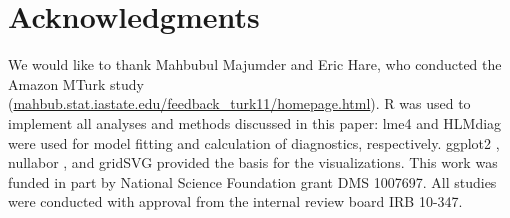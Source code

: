 \documentclass[12pt]{article} %
\newcommand{\hh}[1]{{\color{orange} #1}}
\newcommand{\alnote}[1]{\todo[inline,color=green!40]{#1}} %
\newcommand{\hhnote}[1]{\todo[inline,color=orange!40]{#1}}
\begin{document}




  






\section{Acknowledgments}
We would like to thank Mahbubul Majumder and Eric Hare, who conducted the Amazon MTurk study (\url{mahbub.stat.iastate.edu/feedback_turk11/homepage.html}). R \citep{R} was used to implement all analyses and methods discussed in this paper: lme4 \citep{lme4} and HLMdiag \citep{HLMDiag} were used for model fitting and  calculation of diagnostics, respectively.  ggplot2 \citep{ggplot2}, nullabor \citep{nullabor}, and gridSVG \citep{gridSVG} provided the basis for the visualizations.
This work was funded in part by National Science Foundation grant DMS 1007697. All studies were conducted with approval from the internal review board IRB 10-347.
\end{document}

